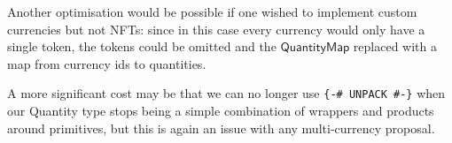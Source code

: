 \documentclass[a4paper]{article}
\newcommand{\s}{\textsf}  %
\newcommand{\qtymap}{\ensuremath{\s{QuantityMap}}}
\begin{document}
\smallskip  Another optimisation would be possible if one wished to
implement custom currencies but not NFTs: since in this case every
currency would only have a single token, the tokens could be omitted
and the $\qtymap$ replaced with a map from currency ids to quantities.

\smallskip A more significant cost may be that we can no longer use
\verb|{-# UNPACK #-}| when our Quantity type stops being a simple
combination of wrappers and products around primitives, but this is
again an issue with any multi-currency proposal.


\end{document}

